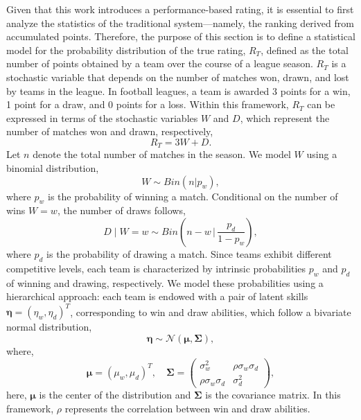 \documentclass[preprint,12pt]{elsarticle}
\begin{document}
Given that this work introduces a performance-based rating, it is essential to first analyze the statistics of the traditional system—namely, the ranking derived from accumulated points.
%
Therefore, the purpose of this section is to define a statistical model for the probability distribution of the true rating, $R_T$, defined as the total number of points obtained by a team over the course of a league season.
%
$R_T$ is a stochastic variable that depends on the number of matches won, drawn, and lost by teams in the league.
%
In football leagues, a team is awarded 3 points for a win, 1 point for a draw, and 0 points for a loss.
%
Within this framework, $R_T$ can be expressed in terms of the stochastic variables $W$ and $D$, which represent the number of matches won and drawn, respectively,
%
\begin{equation}
R_T = 3W + D.
\end{equation}
%
Let $n$ denote the total number of matches in the season. We model $W$ using a binomial distribution,
%
\begin{equation}
W \sim Bin( n | p_w ),
\end{equation}
%
where $p_w$ is the probability of winning a match. Conditional on the number of wins $W=w$, the number of draws follows,
%
\begin{equation}
D \mid W=w \sim Bin\!\left( n-w \,\bigg|\, \frac{p_d}{1-p_w} \right),
\end{equation}
%
where $p_d$ is the probability of drawing a match.
%
Since teams exhibit different competitive levels, each team is characterized by intrinsic probabilities $p_w$ and $p_d$ of winning and drawing, respectively.
%
We model these probabilities using a hierarchical approach: each team is endowed with a pair of latent skills $\boldsymbol{\eta} = (\eta_w, \eta_d)^T$, corresponding to win and draw abilities, which follow a bivariate normal distribution,
%
\begin{equation}
\boldsymbol{\eta} \sim \mathcal{N}\left(\boldsymbol{\mu}, \boldsymbol{\Sigma} \right),
\end{equation}
%
where,
%
\begin{equation}
\boldsymbol{\mu} = ( \mu_w, \mu_d)^T,
\quad
\boldsymbol{\Sigma} =
\begin{pmatrix}
\sigma_w^2 & \rho \sigma_w \sigma_d \\
\rho \sigma_w \sigma_d & \sigma_d^2
\end{pmatrix},
\end{equation}
%
here, $\boldsymbol{\mu}$ is the center of the distribution and $\boldsymbol{\Sigma}$ is the covariance matrix. In this framework, $\rho$ represents the correlation between win and draw abilities.
\end{document}
